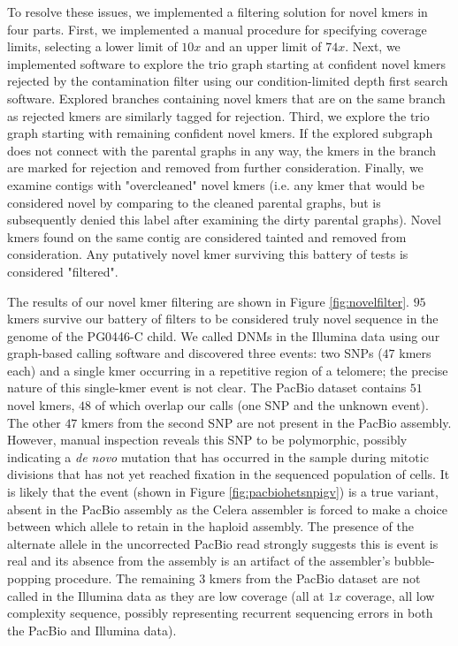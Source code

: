 To resolve these issues, we implemented a filtering solution for novel kmers in four parts.  First, we implemented a manual procedure for specifying coverage limits, selecting a lower limit of $10x$ and an upper limit of $74x$.  Next, we implemented software to explore the trio graph starting at confident novel kmers rejected by the contamination filter using our condition-limited depth first search software.  Explored branches containing novel kmers that are on the same branch as rejected kmers are similarly tagged for rejection.  Third, we explore the trio graph starting with remaining confident novel kmers.  If the explored subgraph does not connect with the parental graphs in any way, the kmers in the branch are marked for rejection and removed from further consideration.  Finally, we examine contigs with "overcleaned" novel kmers (i.e. any kmer that would be considered novel by comparing to the cleaned parental graphs, but is subsequently denied this label after examining the dirty parental graphs).  Novel kmers found on the same contig are considered tainted and removed from consideration.  Any putatively novel kmer surviving this battery of tests is considered "filtered".

The results of our novel kmer filtering are shown in Figure \ref{fig:novelfilter}.  $95$ kmers survive our battery of filters to be considered truly novel sequence in the genome of the PG0446-C child.  We called DNMs in the Illumina data using our graph-based calling software and discovered three events: two SNPs ($47$ kmers each) and a single kmer occurring in a repetitive region of a telomere; the precise nature of this single-kmer event is not clear.  The PacBio dataset contains $51$ novel kmers, $48$ of which overlap our calls (one SNP and the unknown event).  The other $47$ kmers from the second SNP are not present in the PacBio assembly.  However, manual inspection reveals this SNP to be polymorphic, possibly indicating a \textit{de novo} mutation that has occurred in the sample during mitotic divisions that has not yet reached fixation in the sequenced population of cells.  It is likely that the event (shown in Figure \ref{fig:pacbiohetsnpigv}) is a true variant, absent in the PacBio assembly as the Celera assembler is forced to make a choice between which allele to retain in the haploid assembly.  The presence of the alternate allele in the uncorrected PacBio read strongly suggests this is event is real and its absence from the assembly is an artifact of the assembler's bubble-popping procedure.  The remaining $3$ kmers from the PacBio dataset are not called in the Illumina data as they are low coverage (all at $1x$ coverage, all low complexity sequence, possibly representing recurrent sequencing errors in both the PacBio and Illumina data).

